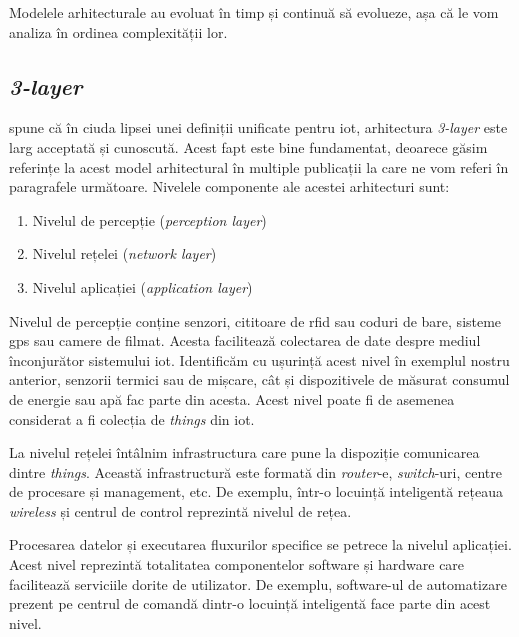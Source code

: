 
Modelele arhitecturale au evoluat în timp și continuă să evolueze, așa că le vom analiza în ordinea complexității lor.

\subsection*{\textit{3-layer}}

\cite{MiaoWu2010} spune că în ciuda lipsei unei definiții unificate pentru \acrshort{iot}, arhitectura \textit{3-layer} este larg acceptată și cunoscută. Acest fapt este bine fundamentat, deoarece găsim referințe la acest model arhitectural în multiple publicații la care ne vom referi în paragrafele următoare. Nivelele componente ale acestei arhitecturi sunt:

\begin{enumerate}
    \item Nivelul de percepție (\textit{perception layer})
    \item Nivelul rețelei (\textit{network layer})
    \item Nivelul aplicației (\textit{application layer})
\end{enumerate}

Nivelul de percepție conține senzori, cititoare de \acrshort{rfid} sau coduri de bare, sisteme \acrfull{gps} sau camere de filmat. Acesta facilitează colectarea de date despre mediul înconjurător sistemului \acrshort{iot}. Identificăm cu ușurință acest nivel în exemplul nostru anterior, senzorii termici sau de mișcare, cât și dispozitivele de măsurat consumul de energie sau apă fac parte din acesta. Acest nivel poate fi de asemenea considerat a fi colecția de \textit{things} din \acrshort{iot}.

La nivelul rețelei întâlnim infrastructura care pune la dispoziție comunicarea dintre \textit{things}. Această infrastructură este formată din \textit{router}-e, \textit{switch}-uri, centre de procesare și management, etc. De exemplu, într-o locuință inteligentă rețeaua \textit{wireless} și centrul de control reprezintă nivelul de rețea.

Procesarea datelor și executarea fluxurilor specifice se petrece la nivelul aplicației. Acest nivel reprezintă totalitatea componentelor software și hardware care facilitează serviciile dorite de utilizator. De exemplu, software-ul de automatizare prezent pe centrul de comandă dintr-o locuință inteligentă face parte din acest nivel.

